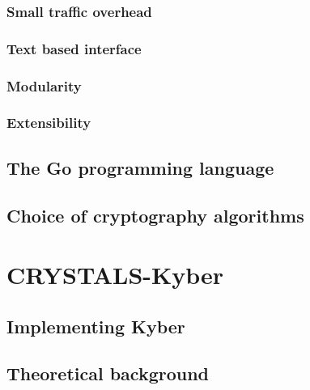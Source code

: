 \subsection{Small traffic overhead}
\label{subsec:network_footprint}


\subsection{Text based interface}
\label{subsec:text_based_interface}


\subsection{Modularity}
\label{subsec:modular_app}


\subsection{Extensibility}
\label{subsec:extensible_app}


\section{The Go programming language}
\label{sec:go_lang}


\section{Choice of cryptography algorithms}
\label{sec:implementations}


\chapter{CRYSTALS-Kyber}
\label{ch:kyber}


\section{Implementing Kyber}
\label{sec:implementing_kyber}


\section{Theoretical background}
\label{sec:kyber_theroteical}


